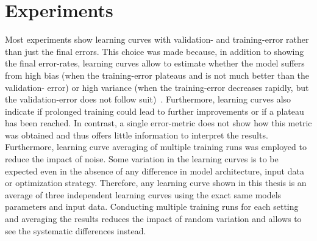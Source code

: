  
\section{Experiments}

Most experiments show learning curves with validation- and training-error rather than just the final errors. This choice was made because, in addition to showing the final error-rates, learning curves allow to estimate whether the model suffers from high bias (when the training-error plateaus and is not much better than the validation-	error) or high variance (when the training-error decreases rapidly, but the validation-error does not follow suit)~\cite{ml_yearning}. Furthermore, learning curves also indicate if prolonged training could lead to further improvements or if a plateau has been reached. In contrast, a single error-metric does not show how this metric was obtained and thus offers little information to interpret the results. Furthermore, learning curve averaging of multiple training runs was employed to reduce the impact of noise. Some variation in the learning curves is to be expected even in the absence of any difference in model architecture, input data or optimization strategy. Therefore, any learning curve shown in this thesis is an average of three independent learning curves using the exact same models parameters and input data. Conducting multiple training runs for each setting and averaging the results reduces the impact of random variation and allows to see the systematic differences instead. 


